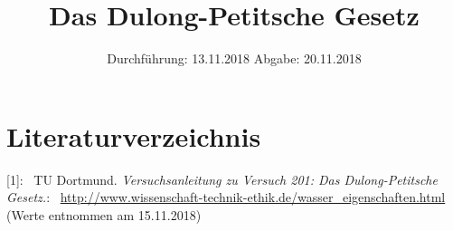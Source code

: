 

\subject{Nr.201}
\title{Das Dulong-Petitsche Gesetz}
\date{%
  Durchführung: 13.11.2018
  \hspace{3em}
  Abgabe: 20.11.2018
}



\maketitle
\thispagestyle{empty}
\tableofcontents
\newpage






\section {Literaturverzeichnis}

[1]: \ TU Dortmund. \textit{Versuchsanleitung zu Versuch 201: Das Dulong-Petitsche Gesetz.}\newline
[2]: \ \url{http://www.wissenschaft-technik-ethik.de/wasser_eigenschaften.html} \\ (Werte entnommen am 15.11.2018)

\printbibliography{}


